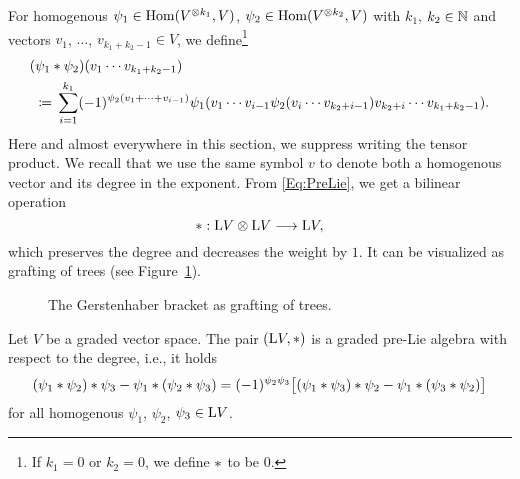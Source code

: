 \documentclass[\MainFolder/Text.tex]{subfiles}
\begin{document}
For homogenous $\psi_1 \in \mathrm{Hom}(V^{\otimes k_1},V)$, $\psi_2 \in \mathrm{Hom}(V^{\otimes k_2},V)$ with $k_1$, $k_2\in\mathbb{N}$ and vectors $v_1$, $\dotsc$, $v_{k_1+k_2-1}\in V$, we define\footnote{If $k_1 = 0$ or $k_2 = 0$, we define $*$ to be $0$.}
\begin{equation}\label{Eq:PreLie}
\begin{aligned}
&(\psi_1 \OpPre \psi_2)(v_1 \dotsb v_{k_1 + k_2 -1}) \\
&\ \coloneqq \begin{multlined}[t]\sum_{i=1}^{k_1} (-1)^{\psi_2(v_1 + \dotsb + v_{i-1})}\psi_1(v_1\dotsb v_{i-1} \psi_2(v_i \dotsb v_{k_2 + i -1}) v_{k_2+i} \dotsb v_{k_1 + k_2 - 1}).\end{multlined}
\end{aligned}
\end{equation}
Here and almost everywhere in this section, we suppress writing the tensor product. We recall that we use the same symbol $v$ to denote both a homogenous vector and its degree in the exponent. From \eqref{Eq:PreLie}, we get a bilinear operation 
\[ *: \mathrm{L} V\otimes \mathrm{L} V \longrightarrow \mathrm{L} V, \]
which preserves the degree and decreases the weight by $1$. It can be visualized as grafting of trees (see Figure~\ref{Fig:GraftTrees}).
\begin{figure}
\centering

\caption{The Gerstenhaber bracket as grafting of trees.}
\label{Fig:GraftTrees}
\end{figure}
\begin{Lemma}\label{Lem:PreLie}
Let $V$ be a graded vector space. The pair $(\mathrm{L} V,*)$ is a graded pre-Lie algebra with respect to the degree, i.e., it holds
\[ (\psi_1 * \psi_2)*\psi_3 -  \psi_1 * (\psi_2*\psi_3) = (-1)^{\psi_2 \psi_3}\bigl[(\psi_1 * \psi_3)*\psi_2 - \psi_1 * (\psi_3*\psi_2)\bigr] \]
for all homogenous $\psi_1$, $\psi_2$, $\psi_3 \in \mathrm{L} V$. 
\end{Lemma}
\end{document}
